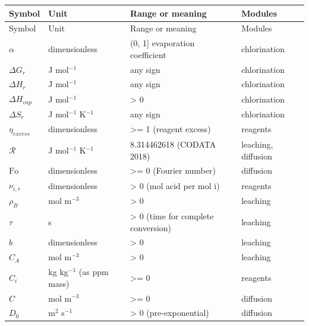 \documentclass[10pt,a4paper,twoside]{report}
\begin{document}
\begin{longtable}{@{}p{}p{}p{}p{}@{}}

\toprule Symbol & Unit & Range or meaning & Modules \\ \midrule

\endfirsthead \toprule Symbol & Unit & Range or meaning & Modules \\ \midrule \endhead

$\alpha$ & dimensionless & (0, 1] evaporation coefficient & chlorination \\

$\Delta G_r$ & J mol$^{-1}$ & any sign & chlorination \\

$\Delta H_r$ & J mol$^{-1}$ & any sign & chlorination \\

$\Delta H_{vap}$ & J mol$^{-1}$ & > 0 & chlorination \\

$\Delta S_r$ & J mol$^{-1}$ K$^{-1}$ & any sign & chlorination \\

$\eta_{excess}$ & dimensionless & >= 1 (reagent excess) & reagents \\

$\mathcal{R}$ & J mol$^{-1}$ K$^{-1}$ & 8.314462618 (CODATA 2018) & leaching, diffusion \\

$\mathrm{Fo}$ & dimensionless & >= 0 (Fourier number) & diffusion \\

$\nu_{i,r}$ & dimensionless & > 0 (mol acid per mol i) & reagents \\

$\rho_B$ & mol m$^{-3}$ & > 0 & leaching \\

$\tau$ & s & > 0 (time for complete conversion) & leaching \\

$b$ & dimensionless & > 0 & leaching \\

$C_A$ & mol m$^{-3}$ & > 0 & leaching \\

$C_i$ & kg kg$^{-1}$ (as ppm mass) & >= 0 & reagents \\

$C$ & mol m$^{-3}$ & >= 0 & diffusion \\

$D_0$ & m$^{2}$ s$^{-1}$ & > 0 (pre-exponential) & diffusion \\


\end{longtable}
\end{document}
